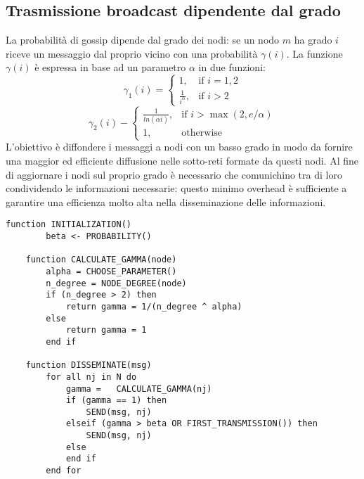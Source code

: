 \begin{appendices}
    \section{Trasmissione broadcast dipendente dal grado}\label{app:sec:ddf}
    La probabilità di gossip dipende dal grado dei nodi: se un nodo $m$ ha grado $i$ riceve un messaggio dal proprio vicino con una probabilità $\gamma(i)$. La funzione $\gamma(i)$ è espressa in base ad un parametro $\alpha$ in due funzioni:
    \begin{equation}
        \gamma_1(i) = \begin{cases} 1, & \mbox{if } i=1,2 \\ \frac{1}{i^{\alpha}}, & \mbox{if } i\gt2\end{cases}
    \end{equation}
    \begin{equation}
        \gamma_2(i) - \begin{cases} \frac{1}{ln(\alpha i)}, & \mbox{if } i\gt \max(2, e/\alpha) \\ 1, & \mbox{otherwise}\end{cases}
    \end{equation}
    L'obiettivo è diffondere i messaggi a nodi con un basso grado in modo da fornire una maggior ed efficiente diffusione nelle sotto-reti formate da questi nodi. Al fine di aggiornare i nodi sul proprio grado è necessario che comunichino tra di loro condividendo le informazioni necessarie: questo minimo overhead è sufficiente a garantire una efficienza molto alta nella disseminazione delle informazioni.
    \begin{lstlisting}[caption=Pseudocodice dell'algoritmo di diffusione con a broadcast dipendente dal grado]
    function INITIALIZATION()
        beta <- PROBABILITY()
    
    function CALCULATE_GAMMA(node)
        alpha = CHOOSE_PARAMETER()
        n_degree = NODE_DEGREE(node)
        if (n_degree > 2) then
            return gamma = 1/(n_degree ^ alpha)
        else
            return gamma = 1
        end if
    
    function DISSEMINATE(msg)
        for all nj in N do
            gamma =   CALCULATE_GAMMA(nj)
            if (gamma == 1) then
                SEND(msg, nj)
            elseif (gamma > beta OR FIRST_TRANSMISSION()) then           
                SEND(msg, nj)
            else
            end if
        end for
    \end{lstlisting}
\end{appendices}

